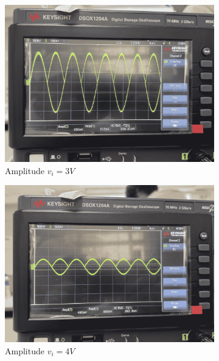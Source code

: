 \begin{figure}[H]
        \begin{subfigure}{0.3\linewidth}
            \includegraphics[width=1\linewidth]{Experiment_14/Images/lab14_3v.png}
            \caption{Amplitude $v_i=3V$}
            \label{wave:14-AC3}
        \end{subfigure}
        \begin{subfigure}{0.3\linewidth}
            \includegraphics[width=1\linewidth]{Experiment_14/Images/lab14_4v.png}
            \caption{Amplitude $v_i=4V$}
            \label{wave:14-AC4}
        \end{subfigure}
        \begin{subfigure}{0.3\linewidth}

\end{subfigure}
\end{figure}
